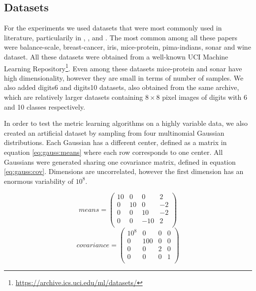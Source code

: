 \documentclass[12pt,a4paper]{report}
\begin{document}
\subsection{Datasets} \label{chap:exp:datasets}
For the experiments we used datasets that were most commonly used in literature, particularily in \cite{xing2002distance}, \cite{weinberger2009distance}, \cite{jacobgoldberger2004neighbourhood} and \cite{fukui2013evolutionary}. The most common among all these papers were balance-scale, breast-cancer, iris, mice-protein, pima-indians, sonar and wine dataset. All these datasets were obtained from a well-known UCI Machine Learning Repository\footnote{\url{https://archive.ics.uci.edu/ml/datasets/}}. Even among these datasets mice-protein and sonar have high dimensionality, however they are small in terms of number of samples. We also added digits6 and digits10 datasets, also obtained from the same archive, which are relatively larger datasets containing $8\times 8$ pixel images of digits with 6 and 10 classes respectively.

In order to test the metric learning algorithms on a highly variable data, we also created an artificial dataset by sampling from four multinomial Gaussian distributions. Each Gaussian has a different center, defined as a matrix in equation \eqref{eq:gauss:means} where each row corresponds to one center. All Gaussians were generated sharing one covariance matrix, defined in equation \eqref{eq:gauss:cov}. Dimensions are uncorrelated, however the first dimension has an enormous variability of $10^8$.

\begin{equation} \label{eq:gauss:means}
means = \begin{pmatrix}
10 & 0 & 0 & 2 \\
0 & 10 & 0 & -2 \\
0 & 0 & 10 & -2 \\
0 & 0 & -10 & 2 \\
\end{pmatrix}
\end{equation}
\begin{equation} \label{eq:gauss:cov}
covariance = \begin{pmatrix}
10^8 & 0 & 0 & 0 \\
0 & 100 & 0 & 0 \\
0 & 0 & 2 & 0 \\
0 & 0 & 0 & 1 \\
\end{pmatrix}
\end{equation}
\end{document}
